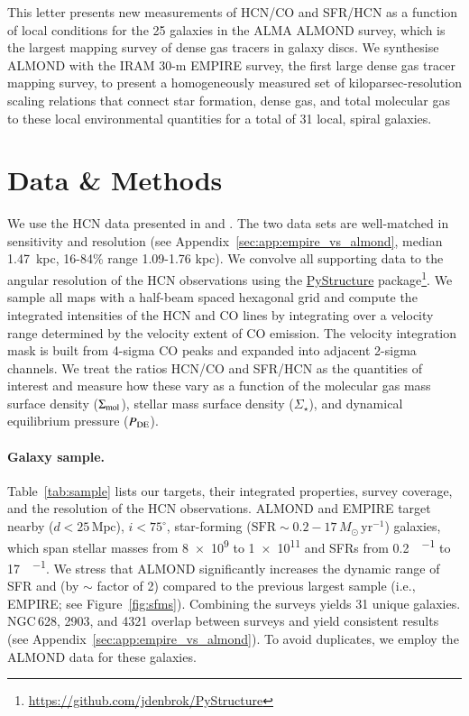 \documentclass[letter, longauth]{aa} %
\begin{document}
This letter presents new measurements of HCN/CO and SFR/HCN as a function of local conditions for the 25 galaxies in the ALMA ALMOND survey, which is the largest mapping survey of dense gas tracers in galaxy discs. 
We synthesise ALMOND with the IRAM 30-m EMPIRE survey, the first large dense gas tracer mapping survey, to present a homogeneously measured set of kiloparsec-resolution scaling relations that connect star formation, dense gas, and total molecular gas to these local environmental quantities for a total of 31 local, spiral galaxies. 

\section{Data \& Methods}
\label{sec:data}
We use the HCN data presented in \citet[][EMPIRE]{Jimenez-Donaire2019} and \citet[][ALMOND]{Neumann2023a}.
The two data sets are well-matched in sensitivity and resolution (see Appendix~\ref{sec:app:empire_vs_almond}, median 1.47~kpc, 16{-}84\% range 1.09{-}1.76 kpc). 
We convolve all supporting data to the angular resolution of the HCN observations using the \hyperlink{https://zenodo.org/records/13787728}{PyStructure} package\footnote{\url{https://github.com/jdenbrok/PyStructure}}. 
We sample all maps with a half-beam spaced hexagonal grid and compute the integrated intensities of the HCN and CO lines by integrating over a velocity range determined by the velocity extent of CO emission. 
The velocity integration mask is built from 4-sigma CO peaks and expanded into adjacent 2-sigma channels.
We treat the ratios HCN/CO and SFR/HCN as the quantities of interest and measure how these vary as a function of the molecular gas mass surface density ($\Sigma_{\rm mol}$), stellar mass surface density ($\Sigma_\star$), and dynamical equilibrium pressure ($P_{\rm DE}$).

\paragraph{Galaxy sample.} 

Table~\ref{tab:sample} lists our targets, their integrated properties, survey coverage, and the resolution of the HCN observations. 
ALMOND and EMPIRE target nearby ($d<25\,\mathrm{Mpc}$), $i<75^\circ$, star-forming ($\mathrm{SFR}\sim0.2-17\,M_\odot\,\mathrm{yr}^{-1}$) galaxies, which span stellar masses from \SI{8e9}{\msun} to \SI{1e11}{\msun} and SFRs from \SI{0.2}{\msun\per\year} to \SI{17}{\msun\per\year}.
We stress that ALMOND significantly increases the dynamic range of SFR and \mstar (by $\sim$ factor of 2) compared to the previous largest sample (i.e., EMPIRE; see Figure~\ref{fig:sfms}).
Combining the surveys yields 31 unique galaxies.
NGC\,628, 2903, and 4321 overlap between surveys and yield consistent results (see Appendix~\ref{sec:app:empire_vs_almond}). 
To avoid duplicates, we employ the ALMOND data for these galaxies.
\end{document}
